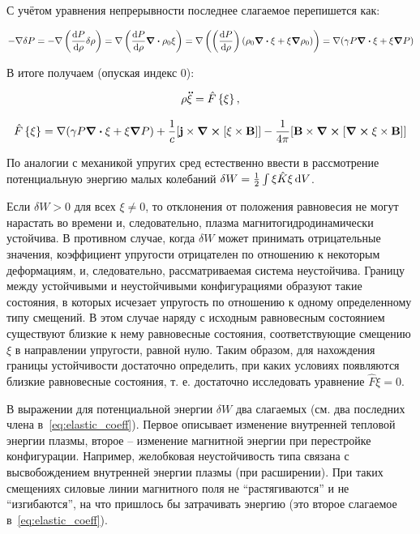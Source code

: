 \documentclass[10pt, a4paper]{article}
\begin{document}
С учётом уравнения непрерывности последнее слагаемое перепишется как:

\begin{equation*}
	-\nabla \delta P = -\nabla \left(\dv{P}{\rho}\delta\rho\right) = \nabla\left(\dv{P}{\rho}\div{\rho_0\xi}\right) = \nabla \left(\left(\dv{P}{\rho}\right) (\rho_0\div{\xi}+\xi\grad{\rho_0})\right) = \nabla(\gamma P\div{\xi}+\xi\grad{P})  
\end{equation*}

В итоге получаем (опуская индекс $0$):

\begin{equation*}
	\rho \vb{\ddot{\xi}}=\hat{F}\left\lbrace\xi\right\rbrace,
\end{equation*}

\begin{equation} \label{eq:elastic_coeff}
	\hat{F}\left\lbrace\xi\right\rbrace = \nabla(\gamma P\div{\xi}+\xi\grad{P}) + \frac{1}{c}[\vb{j}\times\curl{[\vb{\xi}\times\vb{B}]}]-\frac{1}{4\pi}[\vb{B}\times\curl{[\curl{\vb{\xi}\times\vb{B}}]}]
\end{equation}

По аналогии с механикой упругих сред естественно ввести в рассмотрение
потенциальную энергию малых колебаний $\delta W = \frac{1}{2}\int\xi\hat{K}\vb{\xi}\dd{V}$.

Если $\delta W>0$ для всех $\xi\neq0$, то отклонения от положения равновесия не могут нарастать во времени и, следовательно, плазма магнитогидродинамически устойчива. В противном случае, когда $\delta W$ может принимать отрицательные значения, коэффициент упругости отрицателен по отношению к некоторым деформациям, и, следовательно, рассматриваемая система неустойчива. Границу между устойчивыми и неустойчивыми конфигурациями образуют такие состояния, в которых исчезает упругость по отношению к одному определенному типу смещений. В этом случае наряду с исходным равновесным состоянием существуют близкие к нему равновесные состояния, соответствующие смещению $\xi$ в направлении упругости, равной нулю. Таким образом, для нахождения границы устойчивости достаточно определить, при каких условиях появляются близкие равновесные состояния, т. е. достаточно исследовать уравнение $\hat{F}\xi = 0$.

В выражении для потенциальной энергии $\delta W$ два слагаемых (см. два последних члена в~\eqref{eq:elastic_coeff}). Первое описывает изменение внутренней тепловой энергии плазмы, второе -- изменение магнитной энергии при перестройке конфигурации. Например, желобковая неустойчивость типа связана с высвобождением внутренней энергии плазмы (при расширении). При таких смещениях силовые линии магнитного поля не ``растягиваются'' и не ``изгибаются'', на что пришлось бы затрачивать энергию (это второе слагаемое в~\eqref{eq:elastic_coeff}).
\end{document}
